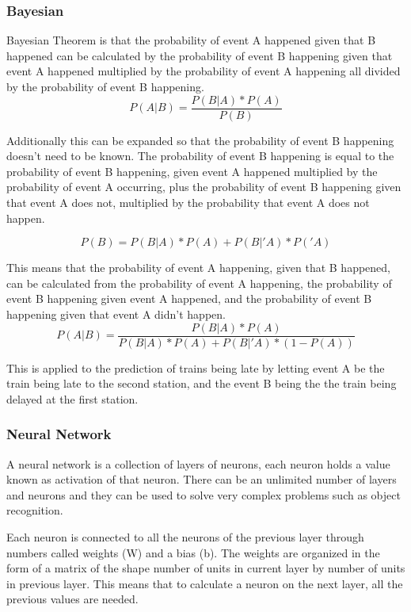 \documentclass[11pt]{article}
\begin{document}
	\subsubsection{Bayesian}
	
	Bayesian Theorem is that the probability of event A happened given that B happened can be calculated by the probability of event B happening given that event A happened multiplied by the probability of event A happening all divided by the probability of event B happening.	
	\[P(A|B) = \frac{P(B|A) * P(A)}{P(B)}\]
	
	Additionally this can be expanded so that the probability of event B happening doesn't need to be known. 
	The probability of event B happening is equal to the probability of event B happening, given event A happened multiplied by the probability of event A occurring, plus the probability of event B happening given that event A does not, multiplied by the probability that event A does not happen.
	
	\[P(B) = P(B|A) * P(A) + P(B|'A) * P('A)\]
	
	This means that the probability of event A happening, given that B happened, can be calculated from the probability of event A happening, the probability of event B happening given event A happened, and the probability of event B happening given that event A didn't happen.
	\[P(A|B) = \frac{P(B|A) * P(A)}{P(B|A) * P(A) + P(B|'A) * (1 - P(A))} \]	
	
	This is applied to the prediction of trains being late by letting event A be the train being late to the second station, and the event B being the the train being delayed at the first station.
	
	\subsubsection{Neural Network}
	
	A neural network is a collection of layers of neurons, each neuron holds a value known as activation of that neuron. There can be an unlimited number of layers and neurons and they can be used to solve very complex problems such as object recognition.
	
	Each neuron is connected to all the neurons of the previous layer through numbers called weights (W) and a bias (b). The weights are organized in the form of a matrix of the shape number of units in current layer by number of units in previous layer. This means that to calculate a neuron on the next layer, all the previous values are needed.
	
\end{document}
